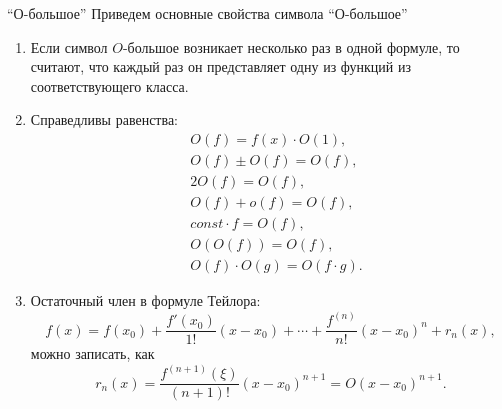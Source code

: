 \documentclass[8pt]{beamer}
\begin{document}

\begin{frame}{``О-большое''}
Приведем основные свойства символа ``О-большое''
\begin{enumerate}
\item Если символ $O$-большое возникает несколько раз в одной формуле, то считают, что каждый раз он представляет одну из функций из соответствующего класса.
\item Справедливы равенства:
\begin{align*}
&O(f) = f(x)\cdot O(1),\\
&O(f) \pm O(f) = O(f),\\
&2 O(f) = O(f),\\
&O(f)+o(f) = O(f),\\
&const \cdot f= O(f),\\
&O(O(f)) = O(f),\\
&O(f)\cdot O(g) = O(f\cdot g).
\end{align*}
\item Остаточный член в формуле Тейлора:
$$f(x) = f(x_0) + \frac{f'(x_0)}{1!}(x-x_0)+\cdots+\frac{f^{(n)}}{n!}(x-x_0)^n+r_{n}(x),$$
можно записать, как
$$r_n(x) = \frac{f^{(n+1)}(\xi)}{(n+1)!}(x-x_0)^{n+1} = O(x-x_0)^{n+1}.$$
\end{enumerate}
\end{frame}
\end{document}
